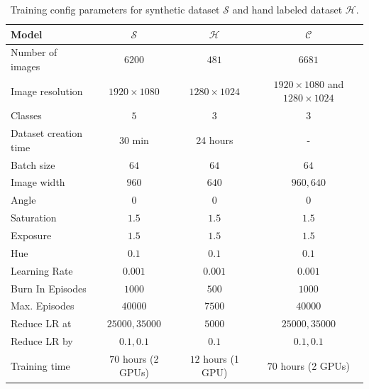 \begin{table}[h]
\centering
\caption{Training config parameters for synthetic dataset $\mathcal{S}$ and hand labeled dataset $\mathcal{H}$.}
\label{tab:1}
\begin{tabular}{|l|ccc|}
\hline
	Model 			& $\mathcal{S}$ & $\mathcal{H}$ & $\mathcal{C}$\\
\hline
	Number of images& $6200$		& $481$	& $6681$\\
	Image resolution& $1920 \times 1080$	& $1280 \times 1024$ & $1920 \times 1080 $ and $1280 \times 1024$ \\
	Classes			& $5$			& $3$ & 3 \\
	Dataset creation time & 30 min & 24 hours & -\\
\hline
	Batch size		& $64$			& $64$  & $64$ \\
	Image width 	& $960$ 		& $640$	& $960, 640$\\
	Angle			& $0$ 			& $0$ 	& $0$\\ 
	Saturation		& $1.5$ 		& $1.5$ & $1.5$ \\
	Exposure		& $1.5$ 		& $1.5$ & $1.5$ \\
	Hue				& $0.1$ 		& $0.1$ & $0.1$ \\
\hline
	Learning Rate	& $0.001$ 		& $0.001$ & $0.001$	\\
	Burn In	Episodes &$1000$		& $500$   & $1000$	\\
	Max. Episodes	& $40000$ 		& $7500$  & $40000$	\\
	Reduce LR at	& $25000, 35000$& $5000$  & $25000, 35000$	\\
	Reduce LR by	& $0.1, 0.1$ 	& $0.1$	 & $0.1, 0.1$	\\
\hline
	Training time   & $70$ hours (2 GPUs) & $12$ hours (1 GPU) & $70$ hours (2 GPUs) \\
\hline
\end{tabular}
\end{table}

